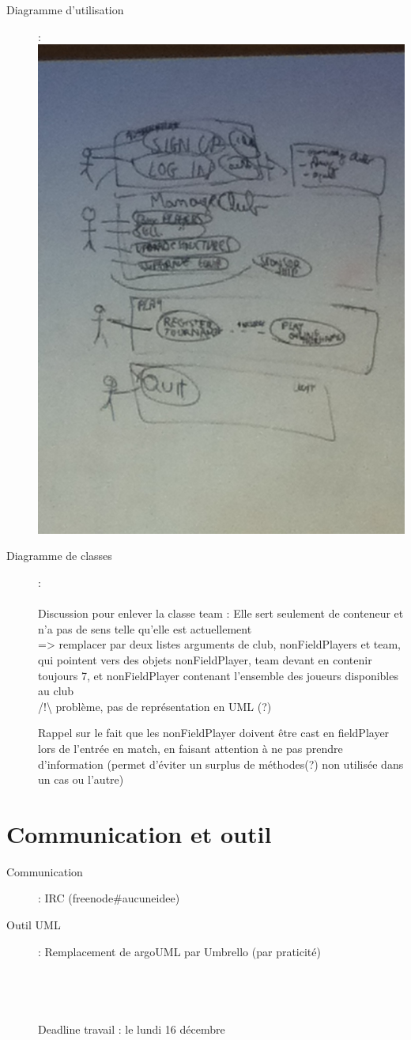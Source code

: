 \documentclass[a4paper,10pt]{article}
\begin{document}
\begin{description}
\item[\LARGE Diagramme d'utilisation] :\\
\includegraphics[angle=-90, scale=0.5]{Use_Case_Diagram.JPG}
\newpage

\item[\LARGE Diagramme de classes] :\\ \\
Discussion pour enlever la classe team : Elle sert seulement de conteneur et n'a pas de sens telle qu'elle est actuellement\\=> remplacer par deux listes arguments de club, nonFieldPlayers et team, qui pointent vers des objets nonFieldPlayer, team devant en contenir toujours 7, et nonFieldPlayer contenant l'ensemble des joueurs disponibles au club\\ /!\textbackslash{} problème, pas de représentation en UML (?)

Rappel sur le fait que les nonFieldPlayer doivent être cast en fieldPlayer lors de l'entrée en match, en faisant attention à ne pas prendre d'information (permet d'éviter un surplus de méthodes(?) non utilisée dans un cas ou l'autre)
\end{description}
\part*{Communication et outil}
\begin{description}
\item[Communication] : IRC (freenode\#aucuneidee)
\item[Outil UML] : Remplacement de argoUML par Umbrello (par praticité)
\\
\\
\\
\\
\\
\LARGE Deadline travail : le lundi 16 décembre
\end{description}
\end{document}
